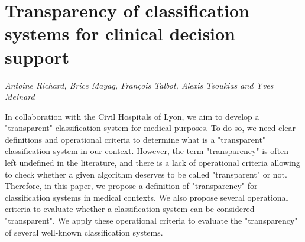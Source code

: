 \documentclass[../booklet.tex]{subfiles}
\begin{document}
\section[Transparency of classification systems for clinical decision support. {\it Antoine Richard, Brice Mayag, François Talbot, Alexis Tsoukias and Yves Meinard}]{Transparency of classification systems for clinical decision support}
    

\begin{center}
  {\it Antoine Richard, Brice Mayag, François Talbot, Alexis Tsoukias and Yves Meinard}
\end{center}

\vskip 0.8cm


  In collaboration with the Civil Hospitals of Lyon, we aim
to develop a "transparent" classification system for medical purposes.
To do so, we need clear definitions and operational criteria to determine
what is a "transparent" classification system in our context.
However, the term "transparency" is often left undefined
in the literature, and there is a lack of operational criteria
allowing to check whether a given algorithm deserves to be called
"transparent" or not.
Therefore, in this paper, we propose a definition of "transparency"
for classification systems in medical contexts.
We also propose several operational criteria to evaluate
whether a classification system can be considered 
"transparent".
We apply these operational criteria to evaluate the 
"transparency" of several well-known classification systems.
\end{document}
